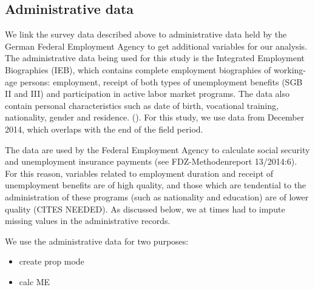 \subsection{Administrative data}\label{admin}

We link the survey data described above to administrative data held by the German Federal Employment Agency to get additional variables for our analysis. The administrative data being used for this study is the Integrated Employment Biographies (IEB), which contains complete employment biographies of  working-age persons: employment, receipt of both types of unemployment benefits (SGB II and III) and participation in  active labor market programs. The data also contain personal characteristics such as date of birth, vocational training, nationality, gender and residence. (\cite{Fitzenbergeretal05}). For this study, we use data from December 2014, which overlaps with the end of the field period.

The data are used by the Federal Employment Agency to calculate social security and unemployment insurance payments (see FDZ-Methodenreport 13/2014:6). For this reason, variables related to employment duration and receipt of unemployment benefits are of high quality, and those which are tendential to the administration of these programs (such as nationality and education) are of lower quality (CITES NEEDED). As discussed below, we at times had to impute missing values in the administrative records. 

We use the administrative data for two purposes:
\begin{itemize}
\item create prop mode
\item calc ME
\end{itemize}





